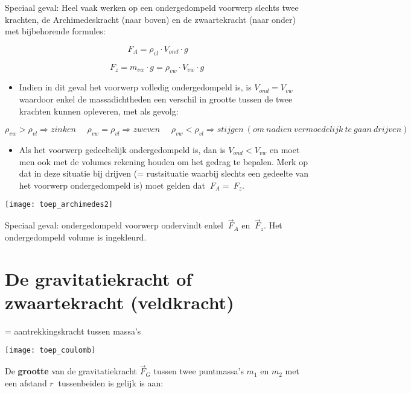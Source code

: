 \documentclass{ximera}
\begin{document}
Speciaal geval: Heel vaak werken op een ondergedompeld voorwerp slechts twee krachten, de Archimedeskracht (naar boven) en de zwaartekracht (naar onder) met bijbehorende formules:

\[{\ F}_{A} = \rho_{vl} \cdot V_{ond} \cdot g \]

\[ F_z = m_{vw} \cdot g = \rho_{vw} \cdot V_{vw} \cdot g \]

\begin{itemize}
\item
  Indien in dit geval het voorwerp volledig ondergedompeld is, is
  \(V_{ond} = V_{vw}\) waardoor enkel de massadichtheden een verschil in
  grootte tussen de twee krachten kunnen opleveren, met als gevolg:
\end{itemize}

\[\rho_{vw} > \rho_{vl}\overset{}{\Rightarrow}zinken\ \ \ \ \ \ \rho_{vw} = \rho_{vl}\overset{}{\Rightarrow}zweven\ \ \ \ \ \ \rho_{vw} < \rho_{vl}\overset{}{\Rightarrow}stijgen\ (om\ nadien\ vermoedelijk\ te\ gaan\ drijven)\]

\begin{itemize}
\item
  Als het voorwerp gedeeltelijk ondergedompeld is, dan is
  \(V_{ond} < V_{vw}\) en moet men ook met de volumes rekening houden om
  het gedrag te bepalen. Merk op dat in deze situatie bij drijven (=
  rustsituatie waarbij slechts een gedeelte van het voorwerp
  ondergedompeld is) moet gelden dat \({\ F}_{A} = {\ F}_{z}\).
\end{itemize}

\begin{image}
\texttt{[image: toep\_archimedes2]}
\end{image}


Speciaal geval: ondergedompeld voorwerp ondervindt enkel \({\ \overrightarrow{F}}_{A}\) en \({\ \overrightarrow{F}}_{z}\). 
Het ondergedompeld volume is ingekleurd.

\section*{De gravitatiekracht of zwaartekracht (veldkracht)}

= aantrekkingskracht tussen massa's

\begin{image}
  \texttt{[image: toep\_coulomb]}
\end{image}

De \textbf{grootte} van de gravitatiekracht \({\overrightarrow{F}}_{G}\) tussen twee puntmassa's \(m_{1}\) en \(m_{2}\) met een afstand \(r\ \) tussenbeiden is gelijk is aan:
\end{document}
